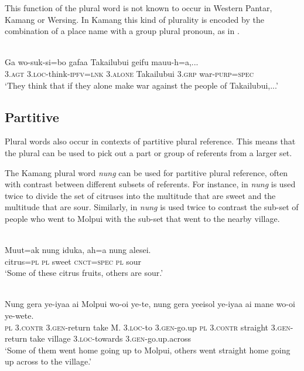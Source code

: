 This function of the plural word is not known to occur in Western Pantar, Kamang or Wersing. In Kamang this kind of plurality is encoded by the combination of a place name with a group plural pronoun, as in .


\ea%
\label{ex:9:83}
 \\
\gll  Ga wo-suk-si=bo gafaa Takailubui geifu {mauu-h=a},...\\
   3.\textsc{agt} \textsc{3.loc-}think\textsc{-ipfv=lnk} 3.\textsc{alone} Takailubui 3.\textsc{grp} war-\textsc{purp}=\textsc{spec} \\
\glt `They think that if they alone make war against the people of Takailubui,...'
\z






\subsection{Partitive} %
\label{sec:9:4.4}
Plural words also occur in contexts of partitive plural reference. This means that the plural can be used to pick out a part or group of referents from a larger set.

The Kamang plural word \textit{nung} can be used for partitive plural reference, often with contrast between different subsets of referents. For instance, in  \textit{nung} is used twice to divide the set of citruses into the multitude that are sweet and the multitude that are sour. Similarly, in  \textit{nung} is used twice to contrast the sub-set of people who went to Molpui with the sub-set that went to the nearby village.


\ea%
\label{ex:9:84}
 \\
\gll  Muut=ak nung iduka, ah=a nung alesei. \\
   citrus=\textsc{pl} \textsc{pl} sweet \textsc{cnct=spec} \textsc{pl} sour  \\
\glt `Some of these citrus fruits, others are sour.'
\z







\ea%
\label{ex:9:85}
 \\
\gll  Nung gera ye-iyaa ai Molpui wo-oi ye-te,  nung gera yeeisol ye-iyaa ai  mane wo-oi ye-wete. \\
    \textsc{pl} \textsc{3.contr} \textsc{3.gen}-return take M. 3.\textsc{loc}-to \textsc{3.gen}-go.up  \textsc{pl} \textsc{3.contr} straight \textsc{3.gen}-return take  village 3.\textsc{loc}-towards \textsc{3.gen}-go.up.across \\
\glt `Some of them went home going up to Molpui, others went straight home going up across to the village.'
\z




